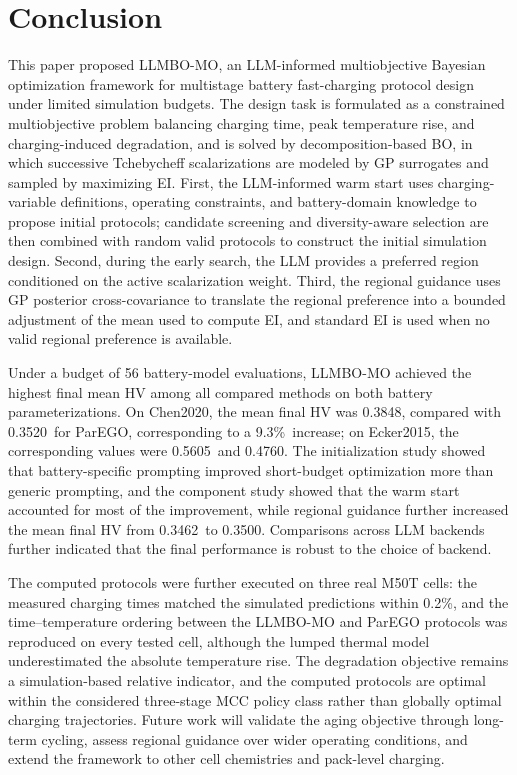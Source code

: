 \documentclass[journal]{IEEEtran}
\newcommand{\ChenLLMBOMean}{0.3848}
\newcommand{\ChenParEGOMean}{0.3520}
\newcommand{\ChenFinalGain}{9.3\%}
\newcommand{\EckerParEGOMean}{0.4760}
\newcommand{\EckerLLMBOMean}{0.5605}
\newcommand{\AblationWarmMean}{0.3462}
\newcommand{\AblationFullMean}{0.3500}
\begin{document}
\section{Conclusion}
\label{sec:conclusion}

This paper proposed LLMBO-MO, an LLM-informed multiobjective Bayesian
optimization framework for multistage battery fast-charging protocol design
under limited simulation budgets. The design task is formulated as a
constrained multiobjective problem balancing charging time, peak temperature
rise, and charging-induced degradation, and is solved by decomposition-based
BO, in which successive Tchebycheff scalarizations are modeled by GP
surrogates and sampled by maximizing EI. First, the LLM-informed warm start
uses charging-variable definitions, operating constraints, and battery-domain
knowledge to propose initial protocols; candidate screening and
diversity-aware selection are then combined with random valid protocols to
construct the initial simulation design. Second, during the early search, the
LLM provides a preferred region conditioned on the active scalarization
weight. Third, the regional guidance uses GP posterior cross-covariance to
translate
the regional preference into a bounded adjustment of the mean used to compute
EI, and standard EI is used when no valid regional preference is available.

Under a budget of 56 battery-model evaluations, LLMBO-MO achieved the highest
final mean HV among all compared methods on both battery parameterizations.
On Chen2020, the mean final HV was \ChenLLMBOMean, compared with
\ChenParEGOMean\ for ParEGO, corresponding to a \ChenFinalGain\ increase; on
Ecker2015, the corresponding values were \EckerLLMBOMean\ and
\EckerParEGOMean. The initialization study showed that battery-specific
prompting improved short-budget optimization more than generic prompting,
and the component study showed that the warm start accounted for
most of the improvement, while regional guidance further increased the mean
final HV from \AblationWarmMean\ to \AblationFullMean. Comparisons across LLM
backends further indicated that the final performance is robust to the
choice of backend.

The computed protocols were further executed on three real M50T cells: the
measured charging times matched the simulated predictions within
0.2\%, and the time--temperature ordering between the LLMBO-MO and ParEGO
protocols was reproduced on every tested cell, although the lumped thermal
model underestimated the absolute temperature rise. The degradation
objective remains a simulation-based relative indicator, and the computed
protocols are optimal within the considered three-stage MCC policy class
rather than globally optimal charging trajectories. Future work will
validate the aging objective through long-term cycling, assess regional
guidance over wider operating conditions, and extend the framework to
other cell chemistries and pack-level charging.
\end{document}

